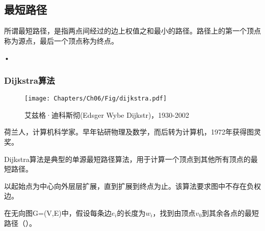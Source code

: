 \subsection{最短路径}
\begin{frame}\ft{\subsecname}
\begin{dingyi}
所谓最短路径，是指两点间经过的边上权值之和最小的路径。路径上的第一个顶点称为源点，最后一个顶点称为终点。
\end{dingyi}
\end{frame}

\begin{frame}\ft{\subsecname}
\begin{figure}
\centering

\end{figure}•

\end{frame}


\subsubsection{\tf Dijkstra算法}

\begin{frame}\ft{\subsubsecname}
\begin{figure}
\centering
\texttt{[image: Chapters/Ch06/Fig/dijkstra.pdf]}
\caption{艾兹格·迪科斯彻(Edsger Wybe Dijkstr)，1930-2002}
\end{figure}

荷兰人，计算机科学家。早年钻研物理及数学，而后转为计算机，1972年获得图灵奖。
\end{frame}

\begin{frame}\ft{\subsubsecname}
\tf Dijkstra算法是典型的单源最短路径算法，用于计算一个顶点到其他所有顶点的最短路径。
\vspace{0.1in}

 以起始点为中心向外层层扩展，直到扩展到终点为止。该算法要求图中不存在负权边。

\vspace{0.1in}

 在无向图G=(V,E)中，假设每条边$e_i$的长度为$w_i$，找到由顶点$v_0$到其余各点的最短路径（）。
\end{frame}

